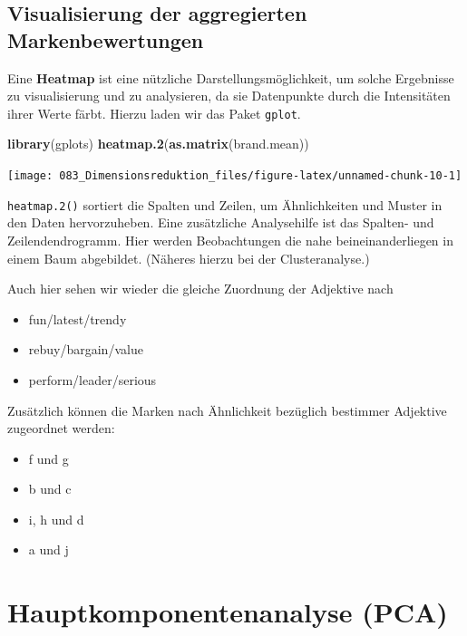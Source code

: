 \documentclass[12pt,]{book}
\newenvironment{Shaded}{\begin{snugshade}}{\end{snugshade}}
\newcommand{\KeywordTok}[1]{\textcolor[rgb]{0.13,0.29,0.53}{\textbf{{#1}}}}
\newcommand{\NormalTok}[1]{{#1}}
\providecommand{\tightlist}{%
  \setlength{\itemsep}{0pt}\setlength{\parskip}{0pt}}
\begin{document}
\subsection{Visualisierung der aggregierten
Markenbewertungen}\label{visualisierung-der-aggregierten-markenbewertungen}

Eine \textbf{Heatmap} ist eine nützliche Darstellungsmöglichkeit, um
solche Ergebnisse zu visualisierung und zu analysieren, da sie
Datenpunkte durch die Intensitäten ihrer Werte färbt. Hierzu laden wir
das Paket \texttt{gplot}.

\begin{Shaded}
\begin{Highlighting}[]
\KeywordTok{library}\NormalTok{(gplots)}
\KeywordTok{heatmap.2}\NormalTok{(}\KeywordTok{as.matrix}\NormalTok{(brand.mean))}
\end{Highlighting}
\end{Shaded}

\begin{center}\texttt{[image: 083\_Dimensionsreduktion\_files/figure-latex/unnamed-chunk-10-1]} \end{center}

\texttt{heatmap.2()} sortiert die Spalten und Zeilen, um Ähnlichkeiten
und Muster in den Daten hervorzuheben. Eine zusätzliche Analysehilfe ist
das Spalten- und Zeilendendrogramm. Hier werden Beobachtungen die nahe
beineinanderliegen in einem Baum abgebildet. (Näheres hierzu bei der
Clusteranalyse.)

Auch hier sehen wir wieder die gleiche Zuordnung der Adjektive nach

\begin{itemize}
\tightlist
\item
  fun/latest/trendy
\item
  rebuy/bargain/value
\item
  perform/leader/serious
\end{itemize}

Zusätzlich können die Marken nach Ähnlichkeit bezüglich bestimmer
Adjektive zugeordnet werden:

\begin{itemize}
\tightlist
\item
  f und g
\item
  b und c
\item
  i, h und d
\item
  a und j
\end{itemize}

\section{Hauptkomponentenanalyse
(PCA)}\label{hauptkomponentenanalyse-pca}
\end{document}
